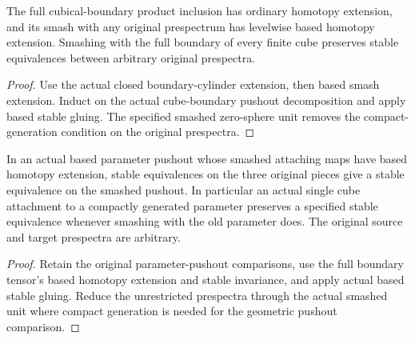 \begin{proposition}
  \label{prop:actual-general-cube-boundary-smash-stability}
  \leanok
  The full cubical-boundary product inclusion has ordinary homotopy extension, and its smash with any original prespectrum has levelwise based homotopy extension. Smashing with the full boundary of every finite cube preserves stable equivalences between arbitrary original prespectra.
\end{proposition}
\begin{proof}
  Use the actual closed boundary-cylinder extension, then based smash extension. Induct on the actual cube-boundary pushout decomposition and apply based stable gluing. The specified smashed zero-sphere unit removes the compact-generation condition on the original prespectra.
  \leanok
\end{proof}

\begin{proposition}
  \label{prop:actual-general-parameter-cell-stability}
  \leanok
  In an actual based parameter pushout whose smashed attaching maps have based homotopy extension, stable equivalences on the three original pieces give a stable equivalence on the smashed pushout. In particular an actual single cube attachment to a compactly generated parameter preserves a specified stable equivalence whenever smashing with the old parameter does. The original source and target prespectra are arbitrary.
\end{proposition}
\begin{proof}
  Retain the original parameter-pushout comparisons, use the full boundary tensor's based homotopy extension and stable invariance, and apply actual based stable gluing. Reduce the unrestricted prespectra through the actual smashed unit where compact generation is needed for the geometric pushout comparison.
  \leanok
\end{proof}

